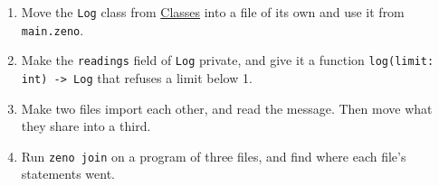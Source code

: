 \begin{tryit}
\begin{enumerate}
\item Move the \verb|Log| class from \hyperref[ch-classes]{Classes}
  into a file of its own and use it from \verb|main.zeno|.
\item Make the \verb|readings| field of \verb|Log| private, and give
  it a function \verb|log(limit: int) -> Log| that refuses a limit
  below 1.
\item Make two files import each other, and read the message. Then
  move what they share into a third.
\item Run \verb|zeno join| on a program of three files, and find where
  each file's statements went.
\end{enumerate}
\end{tryit}

